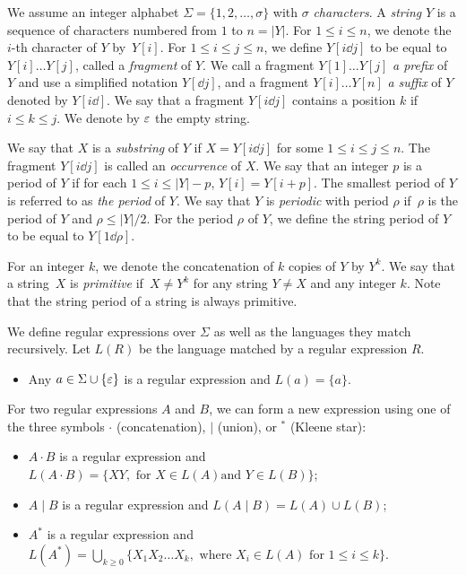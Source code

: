 We assume an integer alphabet $\Sigma = \{1, 2, \ldots, \sigma\}$ with $\sigma$ \emph{characters}. A \emph{string} $Y$ is a sequence of characters numbered from $1$ to $n = |Y|$.  For $1\le i \le n$, we denote the $i$-th character of $Y$ by~$Y[i]$. For $1\le i \le j\le n$, we define $Y[i \dd j]$ to be equal to $Y[i] \dots Y[j]$, called a \emph{fragment} of $Y$. We call a fragment $Y[1] \dots Y[j]$ \emph{a prefix} of $Y$ and use a simplified notation $Y[\dd j]$, and a fragment $Y[i] \dots Y[n]$ \emph{a suffix} of $Y$ denoted by $Y[i \dd]$. We say that a fragment $Y[i \dd j]$ contains a position $k$ if $i \le k \le j$. We denote by $\varepsilon$ the empty string.

We say that $X$ is a \emph{substring} of $Y$ if $X = Y[i \dd j]$ for some $1 \le i \le j \le n$. The fragment $Y[i \dd j]$ is called an \emph{occurrence} of $X$. 
We say that an integer $p$ is a period of $Y$ if for each $1 \le i \le |Y|-p$, $Y[i] = Y[i+p]$. The smallest period of $Y$ is referred to as \emph{the period} of $Y$. We say that $Y$ is \emph{periodic} with period $\rho$ if~$\rho$ is the period of $Y$ and $\rho  \le |Y|/2$. For the period $\rho$ of $Y$, we define the string period of $Y$ to be equal to $Y[1 \dd \rho]$. 

For an integer $k$, we denote the concatenation of $k$ copies of $Y$ by $Y^k$. We say that a string~$X$ is \emph{primitive} if~$X \neq Y^k$ for any string $Y \neq X$ and any integer $k$. Note that the string period of a string is always primitive. 

\begin{definition}
We define regular expressions over $\Sigma$ as well as the languages they match recursively. Let $L(R)$ be the language matched by a regular expression $R$.
\begin{itemize}
\item Any $a \in \Sigma \cup \{\varepsilon\}$ is a regular expression and $L(a)=\{a\}$.
\end{itemize}
For two regular expressions $A$ and $B$, we can form a new expression using one of the three symbols $\cdot$ (concatenation), $\mid$ (union), or ${}^\ast$ (Kleene star):
\begin{itemize}
\item $A \cdot B$ is a regular expression and $L(A \cdot B)=\{XY, \text{ for } X \in L(A) \text{and } Y \in L(B) \}$;
\item $A \mid B$ is a regular expression and $L(A \mid B)= L(A) \cup L(B)$;
\item $A^\ast$ is a regular expression and  $L(A^*)= \bigcup_{k  \geq 0} \{ X_1 X_2 \dots X_k, \text{ where } X_i \in L(A) \text{ for } 1 \leq i \leq k \}$.
\end{itemize}
\end{definition}

